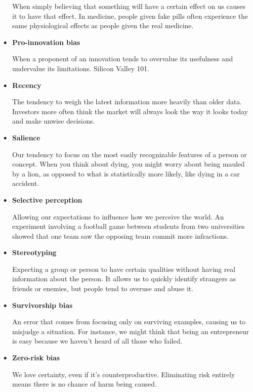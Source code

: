 \begin{itemize}
    When simply believing that something will have a certain effect on us causes it to have that effect.  In medicine, people given fake pills often experience the same physiological effects as people given the real medicine.
    
    \item \textbf{Pro-innovation bias}
    
    When a proponent of an innovation tends to overvalue its usefulness and undervalue its limitations.  Silicon Valley 101.
    
    \item \textbf{Recency}
    
    The tendency to weigh the latest information more heavily than older data.  Investors more often think the market will always look the way it looks today and make unwise decisions.
    
    \item \textbf{Salience}
    
    Our tendency to focus on the most easily recognizable features of a person or concept.  When you think about dying, you might worry about being mauled by a lion, as opposed to what is statistically more likely, like dying in a car accident.
    
    \item \textbf{Selective perception}
    
    Allowing our expectations to influence how we perceive the world.  An experiment involving a football game between students from two universities showed that one team saw the opposing team commit more infractions.
    
    \item \textbf{Stereotyping}
    
    Expecting a group or person to have certain qualities without having real information about the person.  It allows us to quickly identify strangers as friends or enemies, but people tend to overuse and abuse it.
    
    \item \textbf{Survivorship bias}
    
    An error that comes from focusing only on surviving examples, causing us to misjudge a situation.  For instance, we might think that being an entrepreneur is easy because we haven't heard of all those who failed.
    
    \item \textbf{Zero-risk bias}
    
    We love certainty, even if it's counterproductive.  Eliminating risk entirely means there is no chance of harm being caused.
\end{itemize}

